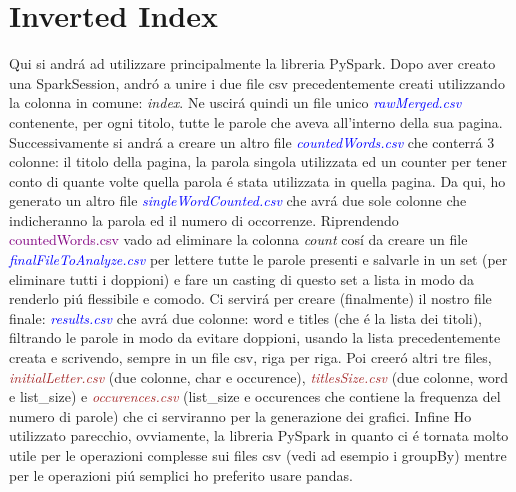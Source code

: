 \documentclass[12pt,a4paper]{article}
\begin{document}
    \section{Inverted Index}
    Qui si andrá ad utilizzare principalmente la libreria PySpark. 
    \newline
    Dopo aver creato una SparkSession, andró a unire i due file csv precedentemente creati utilizzando la colonna in comune: \textit{index}. Ne uscirá quindi un file unico \textit{\textcolor{blue}{rawMerged.csv}} contenente, per ogni titolo, tutte le parole che aveva all'interno della sua pagina. 
    \newline
    Successivamente si andrá a creare un altro file \textit{\textcolor{blue}{countedWords.csv}} che conterrá 3 colonne: il titolo della pagina, la parola singola utilizzata ed un counter per tener conto di quante volte quella parola é stata utilizzata in quella pagina.
    \newline
    Da qui, ho generato un altro file \textit{\textcolor{blue}{singleWordCounted.csv}} che avrá due sole colonne che indicheranno la parola ed il numero di occorrenze.
    \newline
    Riprendendo \textcolor{purple}{countedWords.csv} vado ad eliminare la colonna \textit{count} cosí da creare un file \textit{\textcolor{blue}{finalFileToAnalyze.csv}} per lettere tutte le parole presenti e salvarle in un set (per eliminare tutti i doppioni) e fare un casting di questo set a lista in modo da renderlo piú flessibile e comodo.
    \newline
    Ci servirá per creare (finalmente) il nostro file finale: \textit{\textcolor{blue}{results.csv}} che avrá due colonne: word e titles (che é la lista dei titoli), filtrando le parole in modo da evitare doppioni, usando la lista precedentemente creata e scrivendo, sempre in un file csv, riga per riga.
    \newline
    Poi creeró altri tre files, \textit{\textcolor{brown}{initialLetter.csv}} (due colonne, char e occurence), \textit{\textcolor{brown}{titlesSize.csv}} (due colonne, word e list\_size) e \textit{\textcolor{brown}{occurences.csv}} (list\_size e occurences che contiene la frequenza del numero di parole) che ci serviranno per la generazione dei grafici.
    \newline Infine
    \newline Ho utilizzato parecchio, ovviamente, la libreria PySpark in quanto ci é tornata molto utile per le operazioni complesse sui files csv (vedi ad esempio i groupBy) mentre per le operazioni piú semplici ho preferito usare pandas.
    \newpage
\end{document}
